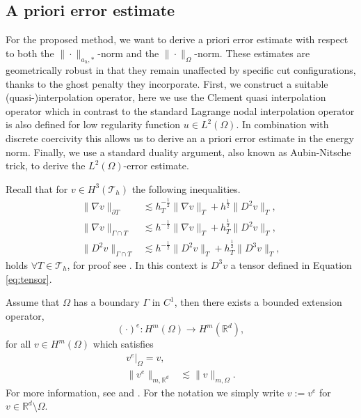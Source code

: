 
\subsection{A priori error estimate}%
\label{sec:a_priori_estimates}


For the proposed method, we want to derive a priori error estimate with respect to both the  $\| \cdot  \|_{a_{h},*   }^{  } $-norm and the  $\| \cdot  \|_{ \Omega  }^{
} $-norm.  These estimates are geometrically robust in that they remain unaffected by specific cut configurations, thanks to the ghost penalty they incorporate.
First, we construct a suitable (quasi-)interpolation operator, here we use the Clement quasi interpolation operator which in contrast to the standard Lagrange nodal interpolation operator is also defined for low regularity function $u \in L^{2}(
\Omega ) $.
In combination with discrete coercivity this allows us to derive an a priori error estimate in the energy norm. Finally, we use a standard duality argument, also known as Aubin-Nitsche trick, to derive the $L^{2}( \Omega ) $-error estimate.

Recall that for $v \in H^{3}( \mathcal{T } _{h}) $ the following inequalities.
\begin{align}
    \label{eq:trace:1}
    \| \nabla v \|_{ \partial T }^{  } &\lesssim h^{-\frac{1}{2}}_{T}\|  \nabla v \|_{ T }^{  }+ h^{\frac{1}{2}} \| D^2 v \|_{T  }^{   }  , \\
    \label{eq:trace:2}
    \| \nabla v \|_{ \Gamma \cap T }^{  } &\lesssim  h^{-\frac{1}{2}} \| \nabla v \|_{T  }^{  }   + h^{\frac{1}{2}}_{T} \| D^2 v \|_{ T }^{  },\\
    \label{eq:trace:3}
    \| D^2 v \|_{ \Gamma \cap T }^{  } &\lesssim  h^{-\frac{1}{2}} \| D^2 v \|_{T  }^{  }   + h^{\frac{1}{2}}_{T} \| D^3 v \|_{ T }^{  },
\end{align}
holds $\forall T \in \mathcal{T} _{h}$, for proof see \cite[Lemma 4.2]{hansbo2003finite}. In this context is $D^3v$ a tensor defined in Equation \eqref{eq:tensor}.

Assume that $\Omega $ has a boundary $\Gamma $ in $C^{1}$, then there exists a bounded extension operator,
\begin{equation}
    ( \cdot ) ^{e}: H^{m}( \Omega )  \to H^{m} ( \mathbb{R} ^{d}),
\end{equation}
for all  $v \in H^{m}( \Omega )$ which satisfies
\begin{equation}
    \begin{split}
 v^{e}| _{\Omega } =   v,  \\
\| v^{e} \|_{ m,\mathbb{R} ^{d}  }^{  } & \lesssim \| v \|_{ m, \Omega  }^{  }.
    \end{split}
\end{equation}
For more information, see \cite[Theorem 9.7]{brezis2011functional} and \cite[p.181, p.185]{stein1970singular}. For the notation we simply write $ v := v^{e}   $ for $v \in \mathbb{R} ^{d} \setminus \Omega $.


